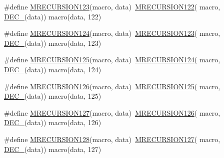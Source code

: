 \begin{DoxyCompactItemize}
\item 
\#define \mbox{\hyperlink{group__group__sam0__utils__mrecursion_ga30375f3389d17c9a74c638545b293447}{M\+R\+E\+C\+U\+R\+S\+I\+O\+N123}}(macro,  data)~\mbox{\hyperlink{group__group__sam0__utils__mrecursion_ga03c32f49f3c98b918cb9924148830594}{M\+R\+E\+C\+U\+R\+S\+I\+O\+N122}}(  macro, \mbox{\hyperlink{group__group__sam0__utils__mrecursion_ga1d23d683797679dca8c3512a54a5dcae}{D\+E\+C\+\_\+}}(data))   macro(data, 122)
\item 
\#define \mbox{\hyperlink{group__group__sam0__utils__mrecursion_ga954c2a20af7ae897731bdf294cdcbc5a}{M\+R\+E\+C\+U\+R\+S\+I\+O\+N124}}(macro,  data)~\mbox{\hyperlink{group__group__sam0__utils__mrecursion_ga30375f3389d17c9a74c638545b293447}{M\+R\+E\+C\+U\+R\+S\+I\+O\+N123}}(  macro, \mbox{\hyperlink{group__group__sam0__utils__mrecursion_ga1d23d683797679dca8c3512a54a5dcae}{D\+E\+C\+\_\+}}(data))   macro(data, 123)
\item 
\#define \mbox{\hyperlink{group__group__sam0__utils__mrecursion_gae1c7af2acfa6b9eaef99a5da874a9f59}{M\+R\+E\+C\+U\+R\+S\+I\+O\+N125}}(macro,  data)~\mbox{\hyperlink{group__group__sam0__utils__mrecursion_ga954c2a20af7ae897731bdf294cdcbc5a}{M\+R\+E\+C\+U\+R\+S\+I\+O\+N124}}(  macro, \mbox{\hyperlink{group__group__sam0__utils__mrecursion_ga1d23d683797679dca8c3512a54a5dcae}{D\+E\+C\+\_\+}}(data))   macro(data, 124)
\item 
\#define \mbox{\hyperlink{group__group__sam0__utils__mrecursion_gaad1e2676e5d1416512a90b49274370c0}{M\+R\+E\+C\+U\+R\+S\+I\+O\+N126}}(macro,  data)~\mbox{\hyperlink{group__group__sam0__utils__mrecursion_gae1c7af2acfa6b9eaef99a5da874a9f59}{M\+R\+E\+C\+U\+R\+S\+I\+O\+N125}}(  macro, \mbox{\hyperlink{group__group__sam0__utils__mrecursion_ga1d23d683797679dca8c3512a54a5dcae}{D\+E\+C\+\_\+}}(data))   macro(data, 125)
\item 
\#define \mbox{\hyperlink{group__group__sam0__utils__mrecursion_gaea7381171385b03934547affe3c25d40}{M\+R\+E\+C\+U\+R\+S\+I\+O\+N127}}(macro,  data)~\mbox{\hyperlink{group__group__sam0__utils__mrecursion_gaad1e2676e5d1416512a90b49274370c0}{M\+R\+E\+C\+U\+R\+S\+I\+O\+N126}}(  macro, \mbox{\hyperlink{group__group__sam0__utils__mrecursion_ga1d23d683797679dca8c3512a54a5dcae}{D\+E\+C\+\_\+}}(data))   macro(data, 126)
\item 
\#define \mbox{\hyperlink{group__group__sam0__utils__mrecursion_ga5c2aeada031c5a2154dcff155a117fb8}{M\+R\+E\+C\+U\+R\+S\+I\+O\+N128}}(macro,  data)~\mbox{\hyperlink{group__group__sam0__utils__mrecursion_gaea7381171385b03934547affe3c25d40}{M\+R\+E\+C\+U\+R\+S\+I\+O\+N127}}(  macro, \mbox{\hyperlink{group__group__sam0__utils__mrecursion_ga1d23d683797679dca8c3512a54a5dcae}{D\+E\+C\+\_\+}}(data))   macro(data, 127)

\end{DoxyCompactItemize}
